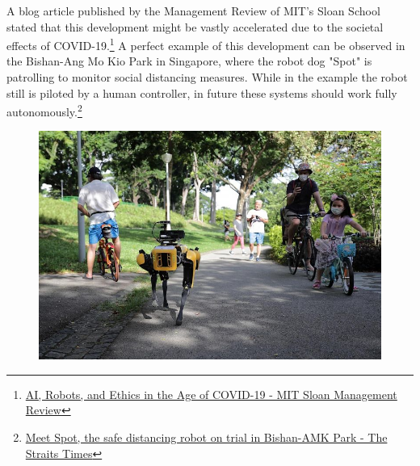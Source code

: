 A blog article published by the Management Review of MIT's Sloan School stated that this development might be vastly accelerated due to the societal effects of COVID-19.\footnote{\href{https://sloanreview.mit.edu/article/ai-robots-and-ethics-in-the-age-of-covid-19/}{AI, Robots, and Ethics in the Age of COVID-19 - MIT Sloan Management Review}} A perfect example of this development can be observed in the Bishan-Ang Mo Kio Park in Singapore, where the robot dog "Spot" is patrolling to monitor social distancing measures. While in the example the robot still is piloted by a human controller, in future these systems should work fully autonomously.\footnote{\href{http://www.straitstimes.com/singapore/meet-spot-the-safe-distancing-robot-on-trial-in-bishan-amk-park}{Meet Spot, the safe distancing robot on trial in Bishan-AMK Park - The Straits Times}}

\begin{figure}[!ht]
\begin{center}
\includegraphics[width=\imgwidth]{images/spot.jpg}
\label{img:spot_in_park}
\end{center}
\end{figure}

